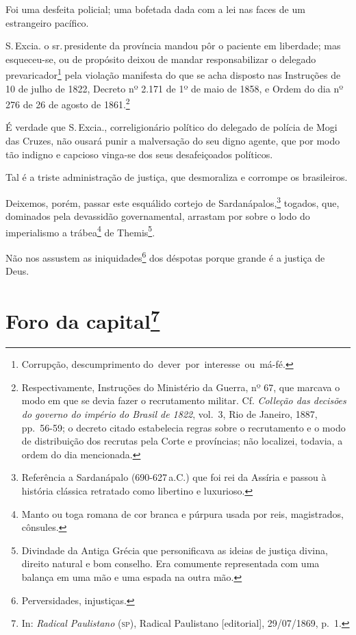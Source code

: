 Foi uma desfeita policial; uma bofetada dada com a lei nas faces de um
estrangeiro pacífico.

S.\,Excia. o sr.\,presidente da província mandou pôr o paciente em
liberdade; mas esqueceu-se, ou de propósito deixou de mandar
responsabilizar o delegado prevaricador\footnote{Corrupção,
  descumprimento do~dever~por~interesse~ou~má-fé.} pela violação
manifesta do que se acha disposto nas Instruções de 10 de julho de 1822,
Decreto nº 2.171 de 1º de maio de 1858, e Ordem do dia nº 276 de 26 de
agosto de 1861.\footnote{Respectivamente, Instruções do Ministério da
  Guerra, nº 67, que marcava o modo em que se devia fazer o recrutamento
  militar. Cf. \emph{Colleção das decisões do governo do império do
  Brasil de 1822}, vol.~3, Rio de Janeiro, 1887, pp.~56-59; o decreto
  citado estabelecia regras sobre o recrutamento e o modo de
  distribuição dos recrutas pela Corte e províncias; não localizei,
  todavia, a ordem do dia mencionada.}

É verdade que S.\,Excia., correligionário político do delegado de polícia
de Mogi das Cruzes, não ousará punir a malversação do seu digno agente,
que por modo tão indigno e capcioso vinga-se dos seus desafeiçoados
políticos.

Tal é a triste administração de justiça, que desmoraliza e corrompe os
brasileiros.

Deixemos, porém, passar este esquálido cortejo de
Sardanápalos,\footnote{Referência a Sardanápalo (690-627\,a.C.) que
  foi rei da Assíria e passou à história clássica retratado como
  libertino e luxurioso.} togados, que, dominados pela devassidão
governamental, arrastam por sobre o lodo do imperialismo a
trábea\footnote{Manto ou toga romana de cor branca e púrpura usada por
  reis, magistrados, cônsules.} de Themis\footnote{Divindade da Antiga
  Grécia que personificava as ideias de justiça divina, direito natural
  e bom conselho. Era comumente representada com uma balança em uma mão
  e uma espada na outra mão.}.

Não nos assustem as iniquidades\footnote{Perversidades, injustiças.}
dos déspotas porque grande é a justiça de Deus.

\chapter{Foro da capital\footnote{In:
  \emph{Radical Paulistano} (\textsc{sp}), Radical Paulistano {[}editorial{]},
  29/07/1869, p.~1.}}

